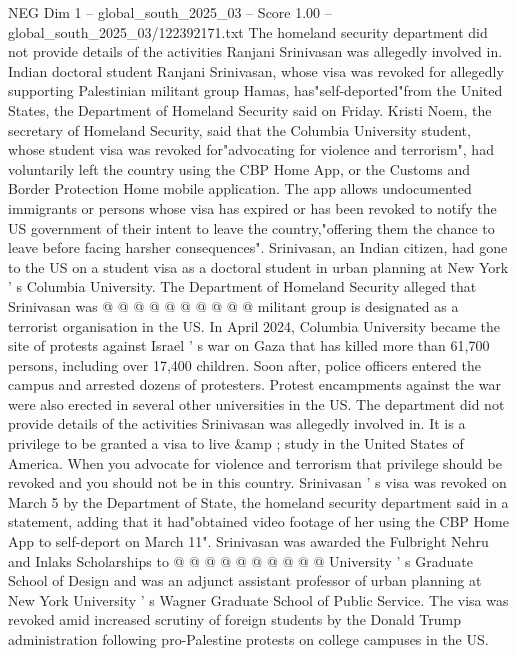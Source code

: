 \begin{textsample}{NEG Dim 1 – global\_south\_2025\_03 – Score 1.00 – global\_south\_2025\_03/122392171.txt}  \label{ex:f1_neg_187}
The homeland security department did not provide details of the activities Ranjani Srinivasan was allegedly involved in.
Indian doctoral student Ranjani Srinivasan, whose visa was revoked for allegedly supporting Palestinian militant group Hamas, has"self-deported"from the United States, the Department of Homeland Security said on Friday.
Kristi Noem, the secretary of Homeland Security, said that the Columbia University student, whose student visa was revoked for"advocating for violence and terrorism", had voluntarily left the country using the CBP Home App, or the Customs and Border Protection Home mobile application.
The app allows undocumented immigrants or persons whose visa has expired or has been revoked to notify the US government of their intent to leave the country,"offering them the chance to leave before facing harsher consequences".
Srinivasan, an Indian citizen, had gone to the US on a student visa as a doctoral student in urban planning at New York ' s Columbia University.
The Department of Homeland Security alleged that Srinivasan was @ @ @ @ @ @ @ @ @ @ militant group is designated as a terrorist organisation in the US.
In April 2024, Columbia University became the site of protests against Israel ' s war on Gaza that has killed more than 61,700 persons, including over 17,400 children.
Soon after, police officers entered the campus and arrested dozens of protesters.
Protest encampments against the war were also erected in several other universities in the US.
The department did not provide details of the activities Srinivasan was allegedly involved in.
It is a privilege to be granted a visa to live \&amp ; study in the United States of America.
When you advocate for violence and terrorism that privilege should be revoked and you should not be in this country.
Srinivasan ' s visa was revoked on March 5 by the Department of State, the homeland security department said in a statement, adding that it had"obtained video footage of her using the CBP Home App to self-deport on March 11".
Srinivasan was awarded the Fulbright Nehru and Inlaks Scholarships to @ @ @ @ @ @ @ @ @ @ University ' s Graduate School of Design and was an adjunct assistant professor of urban planning at New York University ' s Wagner Graduate School of Public Service.
The visa was revoked amid increased scrutiny of foreign students by the Donald Trump administration following pro-Palestine protests on college campuses in the US.

\end{textsample}
